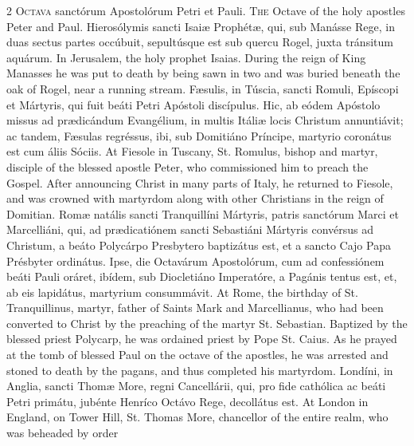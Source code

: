 \begin{paracol}{2}
\lettrine[lines=1]{O}{ctava} sanctórum Apostolórum Petri et Pauli.
\switchcolumn
{}
\lettrine[lines=1]{T}{he} Octave of the holy apostles Peter and Paul.
\switchcolumn*
{}
Hierosólymis sancti 
 Isaiæ Prophétæ, qui, sub Manásse Rege, in duas sectus partes occúbuit, 
 sepultúsque est sub quercu Rogel, juxta tránsitum aquárum.
\switchcolumn
{}
In Jerusalem, the holy prophet 
 Isaias. During the reign of King Manasses he was put to death by being 
 sawn in two and was buried beneath the oak of Rogel, near a running stream.
\switchcolumn*
{}
Fæsulis, in Túscia, 
 sancti Romuli, Epíscopi et Mártyris, qui fuit beáti Petri Apóstoli 
 discípulus. Hic, ab eódem Apóstolo missus ad prædicándum Evangélium, 
 in multis Itáliæ locis Christum annuntiávit; ac tandem, Fæsulas regréssus, 
 ibi, sub Domitiáno Príncipe, martyrio coronátus est cum áliis Sóciis.
\switchcolumn
{}
At Fiesole in Tuscany, St. Romulus, 
 bishop and martyr, disciple of the blessed apostle Peter, who commissioned 
 him to preach the Gospel. After announcing Christ in many parts of 
 Italy, he returned to Fiesole, and was crowned with martyrdom along with 
 other Christians in the reign of Domitian.
\switchcolumn*
{}
Romæ natális sancti 
 Tranquillíni Mártyris, patris sanctórum Marci et Marcelliáni, qui, ad 
 prædicatiónem sancti Sebastiáni Mártyris convérsus ad Christum, a beáto 
 Polycárpo Presbytero baptizátus est, et a sancto Cajo Papa Présbyter ordinátus. Ipse, die Octavárum Apostolórum, cum ad confessiónem beáti 
 Pauli oráret, ibídem, sub Diocletiáno Imperatóre, a Pagánis tentus est, et, 
 ab eis lapidátus, martyrium consummávit.
\switchcolumn
{}
At Rome, the birthday of St. 
 Tranquillinus, martyr, father of Saints Mark and Marcellianus, who had been 
 converted to Christ by the preaching of the martyr St. Sebastian. 
 Baptized by the blessed priest Polycarp, he was ordained priest by Pope St. 
 Caius. As he prayed at the tomb of blessed Paul on the octave of the 
 apostles, he was arrested and stoned to death by the pagans, and thus 
 completed his martyrdom.
\switchcolumn*
{}
Londíni, in Anglia, 
 sancti Thomæ More, regni Cancellárii, qui, pro fide cathólica ac beáti Petri 
 primátu, jubénte Henríco Octávo Rege, decollátus est.
\switchcolumn
{}
At London in England, on Tower Hill, 
 St. Thomas More, chancellor of the entire realm, who was beheaded by order 

\end{paracol}
